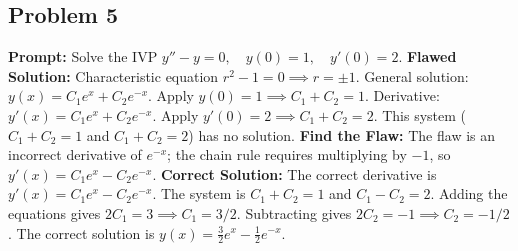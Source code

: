 \documentclass[11pt]{article}
\begin{document}
\subsection{Problem 5}
\textbf{Prompt:} Solve the IVP $y'' - y = 0, \quad y(0) = 1, \quad y'(0) = 2$.
\textbf{Flawed Solution:}
Characteristic equation $r^2 - 1 = 0 \implies r = \pm 1$.
General solution: $y(x) = C_1 e^x + C_2 e^{-x}$.
Apply $y(0) = 1 \implies C_1 + C_2 = 1$.
Derivative: $y'(x) = C_1 e^x + C_2 e^{-x}$.
Apply $y'(0) = 2 \implies C_1 + C_2 = 2$.
This system ($C_1 + C_2 = 1$ and $C_1 + C_2 = 2$) has no solution.
\textbf{Find the Flaw:}
The flaw is an incorrect derivative of $e^{-x}$; the chain rule requires multiplying by $-1$, so $y'(x) = C_1 e^x - C_2 e^{-x}$.
\textbf{Correct Solution:}
The correct derivative is $y'(x) = C_1 e^x - C_2 e^{-x}$.
The system is $C_1 + C_2 = 1$ and $C_1 - C_2 = 2$.
Adding the equations gives $2C_1 = 3 \implies C_1 = 3/2$.
Subtracting gives $2C_2 = -1 \implies C_2 = -1/2$.
The correct solution is $y(x) = \frac{3}{2} e^x - \frac{1}{2} e^{-x}$.
\end{document}
